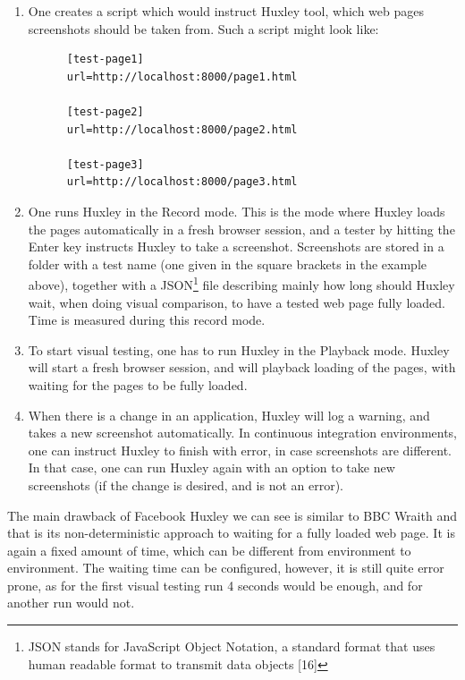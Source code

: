 \documentclass[11pt,oneside,final]{fithesis2}
\begin{document}
  \begin{enumerate}
   \item One creates a script which would instruct Huxley tool, which web pages screenshots should be taken from. Such a script might look like:
  
    \begin{verbatim}
      [test-page1]
      url=http://localhost:8000/page1.html

      [test-page2]
      url=http://localhost:8000/page2.html
   
      [test-page3]
      url=http://localhost:8000/page3.html
    \end{verbatim}
    
    \item One runs Huxley in the Record mode. This is the mode where Huxley loads the pages automatically in a fresh browser session, and a tester by hitting the Enter key instructs 
    Huxley to take a screenshot. Screenshots are stored in a folder with a test name (one given in the square brackets in the example above), together with a 
    JSON\footnote{JSON stands for JavaScript Object Notation, a standard format that uses human readable format to transmit data objects [16]} file describing mainly how long should 
    Huxley wait, when doing visual comparison, to have a tested web page fully loaded. Time is measured during this record mode.
    
    \item To start visual testing, one has to run Huxley in the Playback mode. Huxley will start a fresh browser session, and will playback loading of the pages, with waiting for the pages
    to be fully loaded.
    
    \item When there is a change in an application, Huxley will log a warning, and takes a new screenshot automatically. In continuous integration environments, one can instruct Huxley
    to finish with error, in case screenshots are different. In that case, one can run Huxley again with an option to take new screenshots (if the change is desired, and is not an error).
   \end{enumerate}
    
   The main drawback of Facebook Huxley we can see is similar to BBC Wraith and that is its non-deterministic approach to waiting for a fully loaded web page. It is again a fixed amount of time,
   which can be different from environment to environment. The waiting time can be configured, however, it is still quite error prone, as for the first visual testing run
   4 seconds would be enough, and for another run would not.
    
\end{document}
